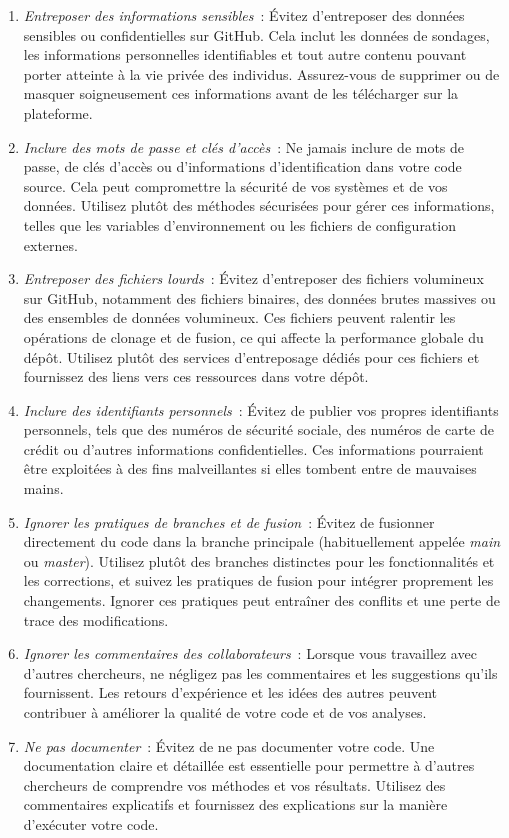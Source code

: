 \documentclass[
  letterpaper,
  DIV=11,
  numbers=noendperiod]{scrreprt}
\begin{document}
\begin{enumerate}
\def\labelenumi{\arabic{enumi}.}
\item
  \emph{Entreposer des informations sensibles}~: Évitez d'entreposer des
  données sensibles ou confidentielles sur GitHub. Cela inclut les
  données de sondages, les informations personnelles identifiables et
  tout autre contenu pouvant porter atteinte à la vie privée des
  individus. Assurez-vous de supprimer ou de masquer soigneusement ces
  informations avant de les télécharger sur la plateforme.
\item
  \emph{Inclure des mots de passe et clés d'accès}~: Ne jamais inclure
  de mots de passe, de clés d'accès ou d'informations d'identification
  dans votre code source. Cela peut compromettre la sécurité de vos
  systèmes et de vos données. Utilisez plutôt des méthodes sécurisées
  pour gérer ces informations, telles que les variables d'environnement
  ou les fichiers de configuration externes.
\item
  \emph{Entreposer des fichiers lourds}~: Évitez d'entreposer des
  fichiers volumineux sur GitHub, notamment des fichiers binaires, des
  données brutes massives ou des ensembles de données volumineux. Ces
  fichiers peuvent ralentir les opérations de clonage et de fusion, ce
  qui affecte la performance globale du dépôt. Utilisez plutôt des
  services d'entreposage dédiés pour ces fichiers et fournissez des
  liens vers ces ressources dans votre dépôt.
\item
  \emph{Inclure des identifiants personnels}~: Évitez de publier vos
  propres identifiants personnels, tels que des numéros de sécurité
  sociale, des numéros de carte de crédit ou d'autres informations
  confidentielles. Ces informations pourraient être exploitées à des
  fins malveillantes si elles tombent entre de mauvaises mains.
\item
  \emph{Ignorer les pratiques de branches et de fusion}~: Évitez de
  fusionner directement du code dans la branche principale
  (habituellement appelée \emph{main} ou \emph{master}). Utilisez plutôt
  des branches distinctes pour les fonctionnalités et les corrections,
  et suivez les pratiques de fusion pour intégrer proprement les
  changements. Ignorer ces pratiques peut entraîner des conflits et une
  perte de trace des modifications.
\item
  \emph{Ignorer les commentaires des collaborateurs}~: Lorsque vous
  travaillez avec d'autres chercheurs, ne négligez pas les commentaires
  et les suggestions qu'ils fournissent. Les retours d'expérience et les
  idées des autres peuvent contribuer à améliorer la qualité de votre
  code et de vos analyses.
\item
  \emph{Ne pas documenter}~: Évitez de ne pas documenter votre code. Une
  documentation claire et détaillée est essentielle pour permettre à
  d'autres chercheurs de comprendre vos méthodes et vos résultats.
  Utilisez des commentaires explicatifs et fournissez des explications
  sur la manière d'exécuter votre code.
\end{enumerate}
\end{document}
